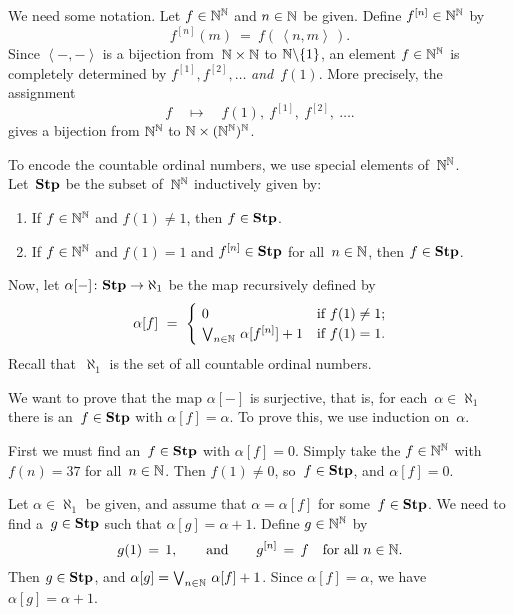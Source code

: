 \documentclass[main.tex]{subfiles}
\begin{document}
We need some notation.
Let $f\in\mathbb{N}^{\mathbb{N}}$
and $n\in \mathbb{N}$ be given.
Define $f^{[n]}\in \mathbb{N}^{\mathbb{N}}$ by
\begin{equation*}
f^{[n]} (m) \ =\ f(\,\left<n,m\right>\,).
\end{equation*}
Since $\left< -,-\right>$
is a bijection from~$\mathbb{N}\times\mathbb{N}$
to $\mathbb{N}\backslash\{1\}$,
an element $f\in\mathbb{N}^{\mathbb{N}}$
is completely determined
by $f^{[1]},f^{[2]},\dotsc$
\emph{and}~$f(1)$.
More precisely,
the assignment
\begin{equation*}
f\quad\mapsto\quad
 f(1),\ f^{[1]},\  f^{[2]},\ \dotsc.
\end{equation*}
gives a bijection from
$\mathbb{N}^{\mathbb{N}}$ to $\mathbb{N} \times (\mathbb{N}^{\mathbb{N}})^{\mathbb{N}}$.

To encode the countable ordinal numbers,
we use special elements of~$\mathbb{N}^{\mathbb{N}}$.\\
Let~$\mathbf{Stp}$ be the subset  of~$\mathbb{N}^{\mathbb{N}}$
inductively given by:
\begin{enumerate}
\item
If $f\in\mathbb{N}^{\mathbb{N}}$ and $f(1)\neq 1$, then $f\in \mathbf{Stp}$.

\item
If $f\in\mathbb{N}^{\mathbb{N}}$
and $f(1)=1$
and $f^{[n]}\in\mathbf{Stp}$ for all~$n\in\mathbb{N}$,
then $f\in \mathbf{Stp}$.
\end{enumerate}
Now, let $\alpha[-]\colon \mathbf{Stp} \rightarrow \aleph_1$
be the map recursively defined by
\begin{equation*}
\alpha[f]\ =\ 
\begin{cases}
\ 0&
\text{if $f(1)\neq1$;}\\
\ \bv_{n\in \N}\ \alpha[f^{[n]}]+1&
\text{if $f(1)= 1$.}
\end{cases}
\end{equation*}
Recall that~$\aleph_1$
is the set of all countable ordinal numbers.

We want to prove that the map $\alpha[-]$ is surjective,
that is,
for each~$\alpha\in\aleph_1$
there is an~$f\in \mathbf{Stp}$ with $\alpha[f]=\alpha$.
To prove this, we use induction on~$\alpha$.

First we must find an~$f\in\mathbf{Stp}$
with $\alpha[f]=0$.
Simply take the $f \in \mathbb{N}^{\mathbb{N}}$
with $f(n)=37$ for all~$n\in \mathbb{N}$.
Then $f(1)\neq 0$, so~$f\in\mathbf{Stp}$, and $\alpha[f]=0$.

Let $\alpha\in \aleph_1$
be given, 
and assume that $\alpha = \alpha[f]$
for some~$f\in\mathbf{Stp}$.
We need to find a~$g\in \mathbf{Stp}$
such that $\alpha[g]=\alpha+1$.
Define $g\in\mathbb{N}^{\mathbb{N}}$ by 
\begin{equation*}
g(1)\,=\,1,\qquad\text{and}\qquad
g^{[n]}\,=\, f\quad\text{for all~$n\in\mathbb{N}$}.
\end{equation*}
Then $g\in\mathbf{Stp}$, and $\alpha[g]=\textstyle{\bigvee}_{n\in\mathbb{N}} \ \alpha[f]+1$.
Since $\alpha[f]=\alpha$, we have $\alpha[g]=\alpha+1$.
\end{document}
